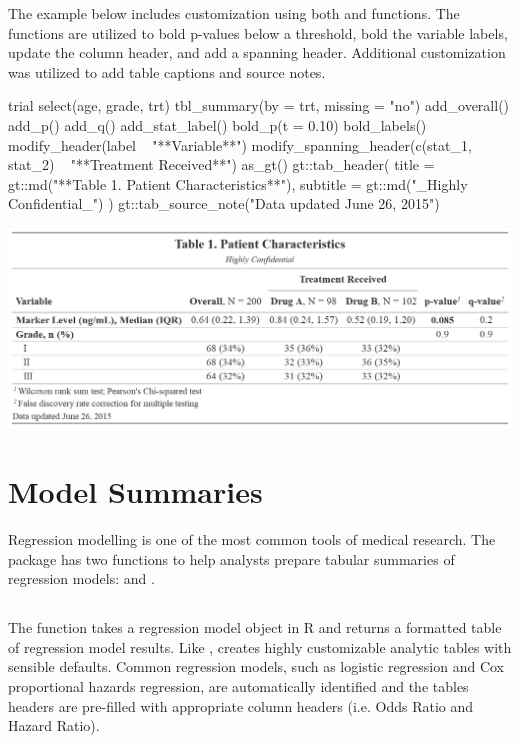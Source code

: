 The example below includes customization using both  and  functions.
The  functions are utilized to bold p-values below a threshold, bold the variable labels,  update the column header, and add a spanning header.
Additional  customization was utilized to add table captions and source notes.

\begin{example}
trial %
  select(age, grade, trt) %
  tbl_summary(by = trt, missing = "no") %
  add_overall() %
  add_p() %
  add_q() %
  add_stat_label() %
  bold_p(t = 0.10) %
  bold_labels() %
  modify_header(label ~ "**Variable**") %
  modify_spanning_header(c(stat_1, stat_2) ~ "**Treatment Received**") %
  as_gt() %
  gt::tab_header(
    title = gt::md("**Table 1. Patient Characteristics**"),
    subtitle = gt::md("_Highly Confidential_")
  ) %
  gt::tab_source_note("Data updated June 26, 2015")
\end{example}
\begin{widefigure}[h!]
  \includegraphics[scale=0.49]{custom.png}
  \centering
\end{widefigure}

\section{Model Summaries}

Regression modelling is one of the most common tools of medical research.
The  package has two functions to help analysts prepare tabular summaries of regression models:  and .

\subsection{\texorpdfstring{}{tbl\_regression()}}

The  function takes a regression model object in R and returns a formatted table of regression model results. 
Like ,  creates highly customizable analytic tables with sensible defaults.
Common regression models, such as logistic regression and Cox proportional hazards regression, are automatically identified and the tables headers are pre-filled with appropriate column headers (i.e. Odds Ratio and Hazard Ratio).

